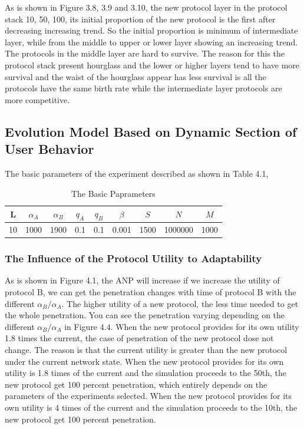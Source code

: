 \documentclass{article}
\begin{document}
As is shown in Figure 3.8, 3.9 and 3.10, the new protocol layer in the protocol stack 10, 50, 100, its initial proportion
of the new protocol is the first after decreasing increasing trend. So the initial proportion is minimum of intermediate
layer, while from the middle to upper or lower layer showing an increasing trend. The protocols in the
middle layer are hard to survive. The reason for this the protocol stack present hourglass and the lower or
higher layers tend to have more survival and the waist of the hourglass appear has less survival is all the protocols have
the same birth rate while the intermediate layer protocols are more competitive.

\subsection{Evolution Model Based on Dynamic Section of User Behavior}
The basic parameters of the experiment described as shown in Table 4.1,
\renewcommand\arraystretch{1.2}
\begin{table}%
  \centering
  \caption{The Basic Paprameters}\label{tab:tab1}
  \begin{tabular}{ccccccccc}
  \hline
  L & $\alpha_A$ & $\alpha_B$ & $q_A$ & $q_B$ &$\beta$ & $S$ & $N$ & $M$ \\
  \hline
  10 & 1000 & 1900 & 0.1 & 0.1 & 0.001 & 1500 & 1000000 & 1000 \\
  \hline
\end{tabular}

\end{table}

\subsubsection{The Influence of the Protocol Utility to Adaptability}
As is shown in Figure 4.1, the ANP will increase if we increase the utility of protocol B, we can get the penetration
changes with time of protocol B with the different $\alpha_{B}/\alpha_{A}$. The higher utility of a new protocol, the
less time needed to get the whole penetration. You can see the penetration varying depending on the different
$\alpha_{B}/\alpha_{A}$ in Figure 4.4. When the new protocol provides for its own utility 1.8 times the current, the
case of penetration of the new protocol dose not change. The reason is that the current utility is greater than the
new protocol under the current network state. When the new protocol provides for its own utility is 1.8 times of the
current and the simulation proceeds to the 50th,  the new protocol get 100 percent penetration, which entirely depends
on the parameters of the experiments selected. When the new protocol provides for its own utility is 4 times of the
current and the simulation proceeds to the 10th, the new protocol get 100 percent penetration.
\end{document}
